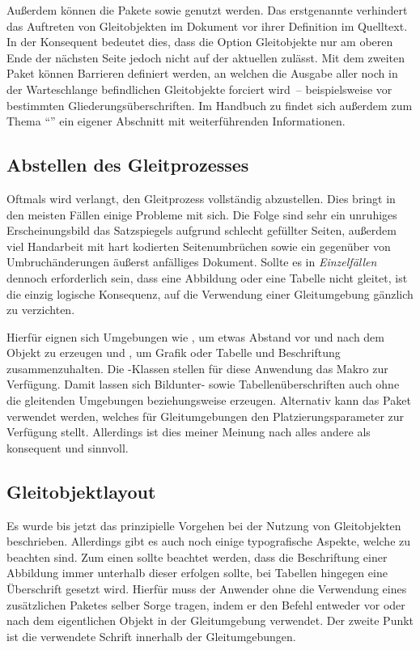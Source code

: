 \documentclass[%
  english,ngerman,%
  cdgeometry=no,DIV=12,automark,%
]{tudscrartcl}
\begin{document}
Außerdem können die Pakete  sowie  genutzt 
werden. Das erstgenannte verhindert das Auftreten von Gleitobjekten im Dokument 
vor ihrer Definition im Quelltext. In der Konsequent bedeutet dies, dass die 
Option  Gleitobjekte nur am oberen Ende der nächsten Seite 
jedoch nicht auf der aktuellen zulässt. Mit dem zweiten Paket können Barrieren 
definiert werden, an welchen die Ausgabe aller noch in der Warteschlange 
befindlichen Gleitobjekte forciert wird~-- beispielsweise vor bestimmten 
Gliederungsüberschriften. Im Handbuch zu \TUDScript findet sich außerdem zum 
Thema \enquote{} 
ein eigener Abschnitt mit weiterführenden Informationen.


\subsection{Abstellen des Gleitprozesses}
Oftmals wird verlangt, den Gleitprozess vollständig abzustellen. Dies bringt in 
den meisten Fällen einige Probleme mit sich. Die Folge sind sehr ein unruhiges 
Erscheinungsbild das Satzspiegels aufgrund schlecht gefüllter Seiten, außerdem 
viel Handarbeit mit hart kodierten Seitenumbrüchen sowie ein gegenüber von 
Umbruchänderungen äußerst anfälliges Dokument. Sollte es in \emph{Einzelfällen} 
dennoch erforderlich sein, dass eine Abbildung oder eine Tabelle nicht gleitet, 
ist die einzig logische Konsequenz, auf die Verwendung einer Gleitumgebung 
gänzlich zu verzichten. 

Hierfür eignen sich Umgebungen wie , um etwas Abstand vor 
und nach dem Objekt zu erzeugen und , um Grafik oder 
Tabelle und Beschriftung zusammenzuhalten. Die \KOMAScript-Klassen stellen für 
diese Anwendung das Makro  zur Verfügung. Damit lassen sich 
Bildunter- sowie Tabellenüberschriften auch ohne die gleitenden Umgebungen 
 beziehungsweise  erzeugen. Alternativ 
kann das Paket  verwendet werden, welches für Gleitumgebungen 
den Platzierungsparameter  zur Verfügung stellt. Allerdings ist 
dies meiner Meinung nach alles andere als konsequent und sinnvoll.


\subsection{Gleitobjektlayout}
\label{sec:floatlayout}
%
Es wurde bis jetzt das prinzipielle Vorgehen bei der Nutzung von Gleitobjekten 
beschrieben. Allerdings gibt es auch noch einige typografische Aspekte, welche 
zu beachten sind. Zum einen sollte beachtet werden, dass die Beschriftung einer 
Abbildung immer unterhalb dieser erfolgen sollte, bei Tabellen hingegen eine 
Überschrift gesetzt wird. Hierfür muss der Anwender ohne die Verwendung eines 
zusätzlichen Paketes selber Sorge tragen, indem er den Befehl  
entweder vor oder nach dem eigentlichen Objekt in der Gleitumgebung verwendet. 
Der zweite Punkt ist die verwendete Schrift innerhalb der Gleitumgebungen. 
\end{document}
